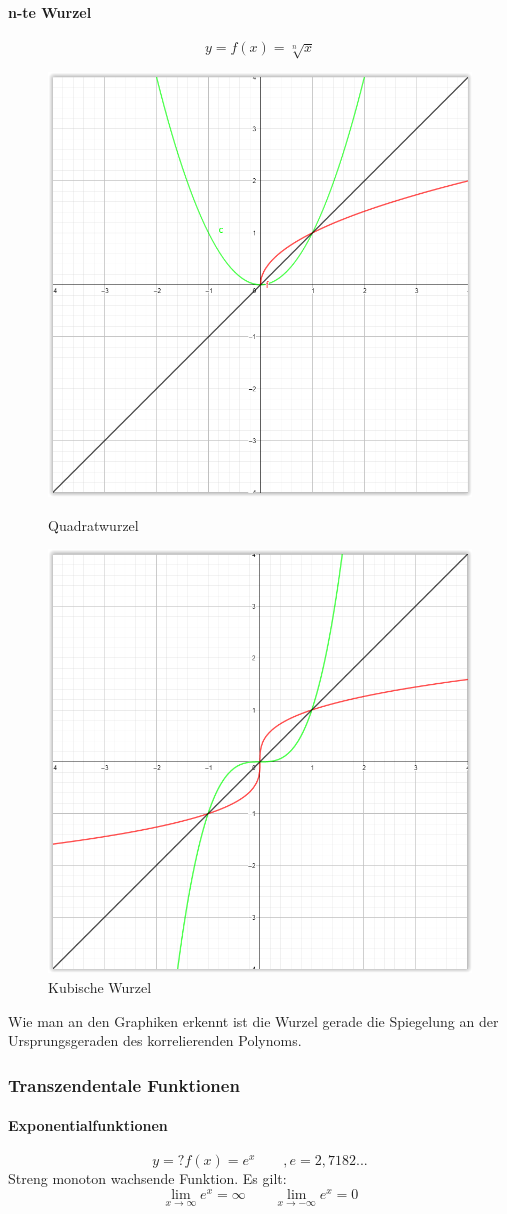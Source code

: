 \documentclass[12pt,a4paper]{article}%
\numberwithin{equation}{section}
\newcommand{\subsubsubsection}{\paragraph}
\numberwithin{equation}{subsection}
\begin{document}
		\subsubsubsection{n-te Wurzel}
		\begin{equation}
		  y = f(x) = \sqrt[n]{x}
		\end{equation}
		\begin{figure}[H] 
		\centering
		\begin{minipage}{.5\textwidth}
		  \centering
		  \includegraphics[width=0.6\linewidth]{funktionen_wurzel_2.png}
		  \caption{Quadratwurzel}
		  \label{fig:funkt_root_1}
		\end{minipage}%
		\begin{minipage}{.5\textwidth}
		  \centering
		  \includegraphics[width=0.6\linewidth]{funktionen_wurzel_3.png}
		  \caption{Kubische Wurzel}
		  \label{fig:funkt_root_2}
		\end{minipage}
		\end{figure}
		Wie man an den Graphiken erkennt ist die Wurzel gerade die Spiegelung an der Ursprungsgeraden des korrelierenden Polynoms. 
		
		\subsubsection{Transzendentale Funktionen}
		\subsubsubsection{Exponentialfunktionen}
		\begin{equation}
		  y =? f(x) = e^x \qquad, e = 2,7182...
		\end{equation}
		Streng monoton wachsende Funktion. Es gilt:
		\begin{equation}
		  \lim_{x\rightarrow \infty} e^x = \infty \qquad \lim_{x\rightarrow -\infty} e^x = 0
		\end{equation}
		
\end{document}
